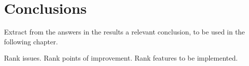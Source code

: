 
\section{Conclusions}
Extract from the answers in the results a relevant conclusion, to be used in the following chapter.

Rank issues.
Rank points of improvement.
Rank features to be implemented.